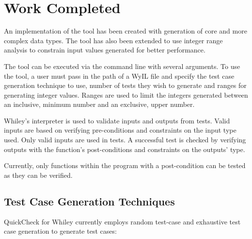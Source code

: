 \section{Work Completed}\label{section:work}



An implementation of the tool has been created with generation of core and more complex data types. The tool has also been extended to use integer range analysis to constrain input values generated for better performance.

The tool can be executed via the command line with several arguments. To use the tool, a user must pass in the path of a WyIL file and specify the test case generation technique to use, number of tests they wish to generate and ranges for generating integer values. Ranges are used to limit the integers generated between an inclusive, minimum number and an exclusive, upper number.

Whiley's interpreter is used to validate inputs and outputs from tests. Valid inputs are based on verifying pre-conditions and constraints on the input type used. Only valid inputs are used in tests. A successful test is checked by verifying outputs with the function's post-conditions and constraints on the outputs' type.


Currently, only functions within the program with a post-condition can be tested as they can be verified.

\subsection{Test Case Generation Techniques}

QuickCheck for Whiley currently employs random test-case and exhaustive test case generation to generate test cases: 

